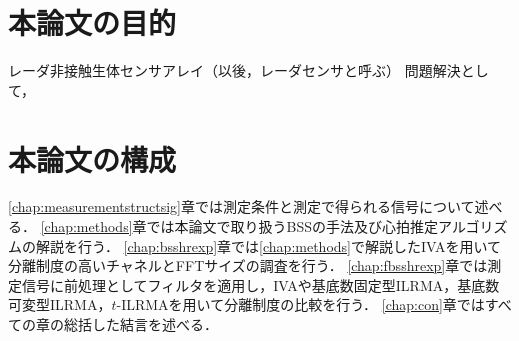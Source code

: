 \section{本論文の目的}
レーダ非接触生体センサアレイ（以後，レーダセンサと呼ぶ）
問題解決として，
\section{本論文の構成}
\ref{chap:measurementstructsig}章では測定条件と測定で得られる信号について述べる．
\ref{chap:methods}章では本論文で取り扱うBSSの手法及び心拍推定アルゴリズムの解説を行う．
\ref{chap:bsshrexp}章では\ref{chap:methods}で解説したIVAを用いて分離制度の高いチャネルとFFTサイズの調査を行う．
\ref{chap:fbsshrexp}章では測定信号に前処理としてフィルタを適用し，IVAや基底数固定型ILRMA，基底数可変型ILRMA，$t$-ILRMAを用いて分離制度の比較を行う．
\ref{chap:con}章ではすべての章の総括した結言を述べる．